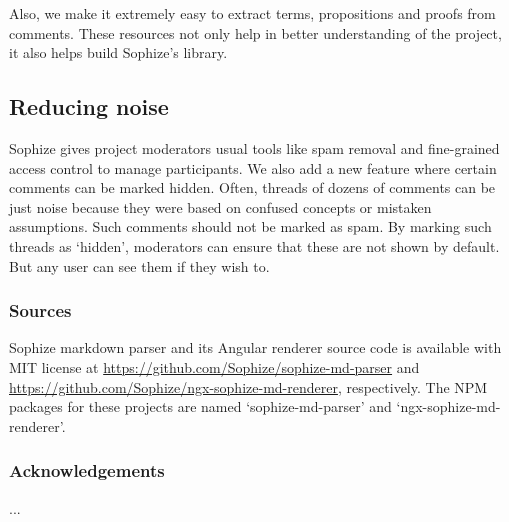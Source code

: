 \documentclass[a4paper]{article}
\begin{document}
Also, we make it extremely easy to extract terms, propositions and proofs from comments. These resources not only help in better understanding of the project, it also helps build Sophize's library.


\subsection{Reducing noise}

Sophize gives project moderators usual tools like spam removal and fine-grained access control to manage participants. We also add a new feature where certain comments can be marked hidden. Often, threads of dozens of comments can be just noise because they were based on confused concepts or mistaken assumptions. Such comments should not be marked as spam. By marking such threads as `hidden', moderators can ensure that these are not shown by default. But any user can see them if they wish to.

\subsubsection*{Sources}
Sophize markdown parser and its Angular renderer source code is available with MIT license at \url{https://github.com/Sophize/sophize-md-parser} and \url{https://github.com/Sophize/ngx-sophize-md-renderer}, respectively. The NPM packages for these projects are named `sophize-md-parser' and `ngx-sophize-md-renderer'.

\subsubsection*{Acknowledgements}

...


 








\end{document}
